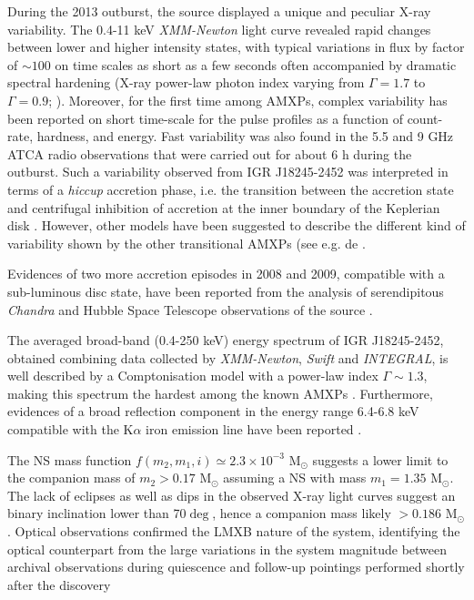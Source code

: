 \documentclass[graybox]{svmult}
\def \inte {{\em INTEGRAL\xspace}}
\def \swift {{\em Swift\xspace}}
\def \chandra {{\em Chandra\xspace}}
\def \xmm {{\em XMM-Newton\xspace}}
\begin{document}
During the 2013 outburst, the source displayed a unique and peculiar X-ray variability. The 0.4-11 keV \xmm{} light curve revealed rapid changes between lower and higher intensity states, with typical variations in flux by factor of $\sim100$ on time scales as short as a few seconds often accompanied by dramatic spectral hardening (X-ray power-law photon index varying from $\Gamma=1.7$ to  $\Gamma=0.9$; \cite{Ferrigno2014}). Moreover, for the first time among AMXPs, complex variability has been reported on short time-scale for the pulse profiles as a function of count-rate, hardness, and energy. Fast variability was also found in the 5.5 and 9 GHz ATCA radio observations that were carried out for about 6 h during the outburst. Such a variability observed from IGR J18245-2452 was interpreted in terms of a {\it hiccup} accretion phase, i.e. the transition between the accretion state and centrifugal inhibition of accretion at the inner boundary of the Keplerian disk \cite{Papitto2013b,Ferrigno2014}. However, other models have been suggested to describe the different kind of variability shown by the other transitional AMXPs (see e.g. de \cite{demartino2013,papitto2014a,Shahbaz2015}.

Evidences of two more accretion episodes in 2008 and 2009, compatible with a sub-luminous disc state, have been reported from the analysis of serendipitous \chandra{} and Hubble Space Telescope observations of the source \cite{Papitto2013b,Linares2014}.

The averaged broad-band (0.4-250 keV) energy spectrum of IGR J18245-2452, obtained combining data collected by \xmm{}, \swift{} and \inte{}, is well described by a Comptonisation model with a power-law index $\Gamma \sim 1.3$, making this spectrum the hardest among the known AMXPs \cite{defalco2017}. Furthermore, evidences of a broad reflection component in the energy range 6.4-6.8 keV compatible with the K$\alpha$ iron emission line have been reported \cite{Papitto2013b,Ferrigno2014}.


The NS mass function $f(m_2, m_1, i)\simeq 2.3\times10^{-3}$ M$_\odot$ suggests a lower limit to the companion mass of $m_2 > 0.17$ M$_\odot$ assuming a NS with mass $m_1=1.35$ M$_\odot$. The lack of eclipses as well as dips in the observed X-ray light curves suggest an binary inclination lower than 70$\deg$, hence  a companion mass likely $> 0.186$ M$_\odot$. Optical observations confirmed the LMXB nature of the system, identifying the optical counterpart from the large variations in the system magnitude between archival observations during quiescence and follow-up pointings performed shortly after the discovery \cite{Monard2013,Pallanca13}
\end{document}
